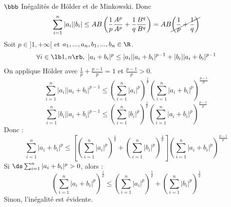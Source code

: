 \documentclass[11pt]{article}
\begin{document}
\begin{exercice}{$\bbb$ Inégalités de Hölder et de Minkowski.}{}
    Donc
    \begin{equation*}
        \sum_{i=1}^n|a_i||b_i|\leq AB\left( \frac{1}{p}\frac{A^p}{A^p} + \frac{1}{q}\frac{B^q}{B^q} \right)=AB\cancel{\left( \frac{1}{p} + \frac{1}{q} \right)}
    \end{equation*}
     Soit $p\in]1,+\infty[$ et $a_1,...,a_n,b_1,...,b_n\in\R$.
    \begin{equation*}
        \forall i \in \lb1,n\rb, ~ |a_i+b_i|^p\leq|a_i||a_i+b_i|^{p-1}+|b_i||a_i+b_i|^{p-1}
    \end{equation*}
    On applique Hölder avec $\frac{1}{p}+\frac{p-1}{p}=1$ et $\frac{p-1}{p}>0$.
    \begin{equation*}
        \sum_{i=1}^n|a_i||a_i+b_i|^{p-1}\leq\left( \sum_{i=1}^n|a_i|^p \right)^{\frac{1}{p}}\left( \sum_{i=1}^n|a_i+b_i|^p \right)^{\frac{p-1}{p}}
    \end{equation*}
    \begin{equation*}
        \sum_{i=1}^n|b_i||a_i+b_i|^{p-1}\leq\left( \sum_{i=1}^n|b_i|^p \right)^\frac{1}{p}\left( \sum_{i=1}^n|a_i+b_i|^p \right)^{\frac{p-1}{p}}
    \end{equation*}
    Donc :
    \begin{equation*}
        \sum_{i=1}^n|a_i+b_i|^p\leq\left[ \left( \sum_{i=1}^n|a_i|^p \right)^\frac{1}{p} + \left( \sum_{i=1}^n|b_i|^p \right)^\frac{1}{p} \right]\left( \sum_{i=1}^n|a_i+b_i|^p \right)^{\frac{p-1}{p}}
    \end{equation*}
    Si $\ds\sum_{i=1}^n|a_i+b_i|^p>0$, alors :
    \begin{equation*}
        \left( \sum_{i=1}^n|a_i+b_i|^p \right)^{\frac{1}{p}}\leq\left( \sum_{i=1}^n|a_i|^p \right)^\frac{1}{p}+\left( \sum_{i=1}^n|b_i|^p \right)^\frac{1}{p}
    \end{equation*}
    Sinon, l'inégalité est évidente.
\end{exercice}
\end{document}
